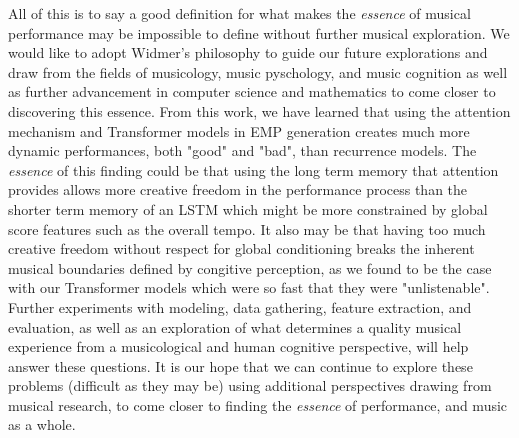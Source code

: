 All of this is to say a good definition for what makes the \emph{essence} of musical performance may be impossible to define without further musical exploration. We would like to adopt Widmer's philosophy to guide our future explorations and draw from the fields of musicology, music pyschology, and music cognition as well as further advancement in computer science and mathematics to come closer to discovering this essence. From this work, we have learned that using the attention mechanism and Transformer models in EMP generation creates much more dynamic performances, both "good" and "bad", than recurrence models. The \emph{essence} of this finding could be that using the long term memory that attention provides allows more creative freedom in the performance process than the shorter term memory of an LSTM which might be more constrained by global score features such as the overall tempo. It also may be that having too much creative freedom without respect for global conditioning breaks the inherent musical boundaries defined by congitive perception, as we found to be the case with our Transformer models which were so fast that they were "unlistenable". Further experiments with modeling, data gathering, feature extraction, and evaluation, as well as an exploration of what determines a quality musical experience from a musicological and human cognitive perspective, will help answer these questions. It is our hope that we can continue to explore these problems (difficult as they may be) using additional perspectives drawing from musical research, to come closer to finding the \emph{essence} of performance, and music as a whole. 

